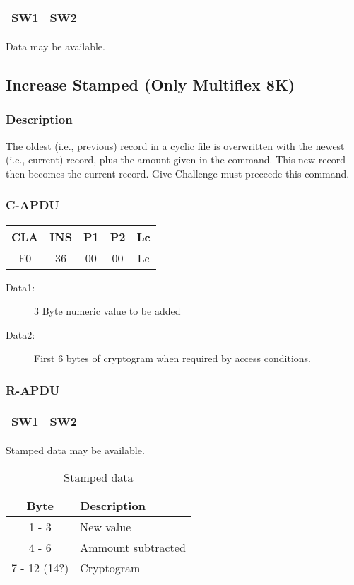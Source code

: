 \documentclass[a4paper,oneside]{article}
\begin{document}
\begin{tabular}{|c|c|} \hline
SW1 & SW2 \\ \hline
\end{tabular}

Data may be available.


\subsection{Increase Stamped (Only Multiflex 8K)}

\subsubsection*{Description}

The oldest (i.e., previous) record in a cyclic file is overwritten
with the newest (i.e., current) record, plus the amount given in the
command. This new record then becomes the current record.
Give Challenge must preceede this command.

\subsubsection*{C-APDU}

\begin{tabular}{|c|c|c|c|c|} \hline
CLA & INS & P1 & P2 & Lc \\ \hline \hline
F0 & 36 & 00 & 00 & Lc \\ \hline
\end{tabular}

\begin{description}
\item[Data1:] 3 Byte numeric value to be added
\item[Data2:] First 6 bytes of cryptogram when required by access conditions.
\end{description}

\subsubsection*{R-APDU}

\begin{tabular}{|c|c|} \hline
SW1 & SW2 \\ \hline
\end{tabular}

Stamped data may be available.

\begin{table}[h!]
\caption{Stamped data}
\begin{center}
\begin{tabular}{|c|l|} \hline
Byte & Description \\ \hline \hline
1 - 3 & New value \\ \hline
4 - 6 & Ammount subtracted \\ \hline
7 - 12 (14?) & Cryptogram \\ \hline
\end{tabular}
\end{center}
\end{table}
\end{document}

